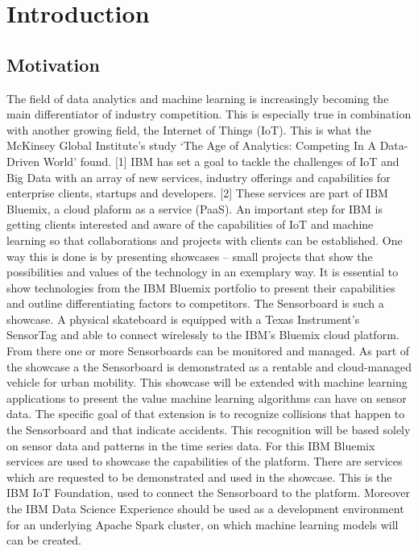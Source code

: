 \chapter{Introduction}
\label{ch:Introduction}

\section{Motivation}
\label{sec:Motivation}
The field of data analytics and machine learning is increasingly becoming the main differentiator of industry competition. This is especially true in combination with another growing field, the Internet of Things (IoT). This is what the McKinsey Global Institute’s study ‘The Age of Analytics: Competing In A Data-Driven World’ found. [1] IBM has set a goal to tackle the challenges of IoT and Big Data with an array of new services, industry offerings and capabilities for enterprise clients, startups and developers. [2] These services are part of IBM Bluemix, a cloud plaform  as a service (PaaS). 
\newline
An important step for IBM is getting clients interested and aware of the capabilities of IoT and machine learning so that collaborations and projects with clients can be established. One way this is done is by presenting showcases – small projects that show the possibilities and values of the technology in an exemplary way. It is essential to show technologies from the IBM Bluemix portfolio to present their capabilities and outline differentiating factors to competitors.
 \newline
The Sensorboard is such a showcase. A physical skateboard is equipped with a Texas Instrument’s SensorTag and able to connect wirelessly to the IBM's Bluemix cloud platform. From there one or more Sensorboards can be monitored and managed. As part of the showcase a the Sensorboard is demonstrated as a rentable and cloud-managed vehicle for urban mobility.
 \newline
This showcase will be extended with machine learning applications to present the value machine learning algorithms can have on sensor data. The specific goal of that extension is to recognize collisions that happen to the Sensorboard and that indicate accidents. This recognition will be based solely on sensor data and  patterns in the time series data. For this IBM Bluemix services are used to showcase the capabilities of the platform. There are services which are requested to be demonstrated and used in the showcase. This is the IBM IoT Foundation, used to connect the Sensorboard to the platform. Moreover the IBM Data Science Experience should be used as a development environment for an underlying Apache Spark cluster, on which machine learning models will can be created.

